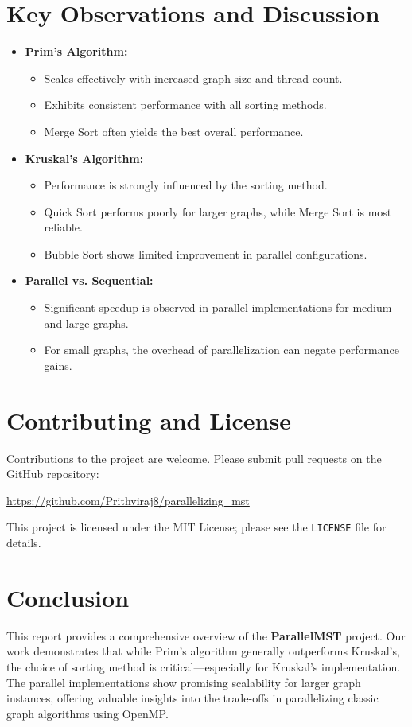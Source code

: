 \documentclass[11pt]{article}
\begin{document}
\section{Key Observations and Discussion}
\begin{itemize}
    \item \textbf{Prim's Algorithm:} 
    \begin{itemize}
        \item Scales effectively with increased graph size and thread count.
        \item Exhibits consistent performance with all sorting methods.
        \item Merge Sort often yields the best overall performance.
    \end{itemize}
    \item \textbf{Kruskal's Algorithm:}
    \begin{itemize}
        \item Performance is strongly influenced by the sorting method.
        \item Quick Sort performs poorly for larger graphs, while Merge Sort is most reliable.
        \item Bubble Sort shows limited improvement in parallel configurations.
    \end{itemize}
    \item \textbf{Parallel vs. Sequential:} 
    \begin{itemize}
        \item Significant speedup is observed in parallel implementations for medium and large graphs.
        \item For small graphs, the overhead of parallelization can negate performance gains.
    \end{itemize}
\end{itemize}

\section{Contributing and License}
Contributions to the project are welcome. Please submit pull requests on the GitHub repository:
\begin{center}
\url{https://github.com/Prithviraj8/parallelizing_mst}
\end{center}
This project is licensed under the MIT License; please see the \texttt{LICENSE} file for details.

\section{Conclusion}
This report provides a comprehensive overview of the \textbf{ParallelMST} project. Our work demonstrates that while Prim's algorithm generally outperforms Kruskal's, the choice of sorting method is critical—especially for Kruskal's implementation. The parallel implementations show promising scalability for larger graph instances, offering valuable insights into the trade-offs in parallelizing classic graph algorithms using OpenMP.
\end{document}
